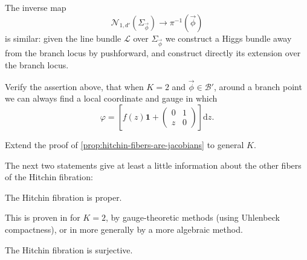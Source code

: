 \documentclass[12pt,letterpaper,reqno]{article}
\numberwithin{equation}{section}
\newcommand{\cB}{\ensuremath{\mathcal B}}
\newcommand{\cL}{\ensuremath{\mathcal L}}
\newcommand{\cN}{\ensuremath{\mathcal N}}
\newcommand\bid{{\mathbf 1}}
\newcommand{\de}{\mathrm{d}}
\newcommand{\fixme}[1]{{\color{orange}{[#1]}}}
\begin{document}
\begin{pf}
The inverse map 
\begin{equation}
\cN_{1,d'}(\Sigma_{\vec\phi}) \to \pi^{-1}(\vec\phi) 
\end{equation}
is similar: given the line bundle $\cL$
over $\Sigma_{\vec\phi}$ we construct a Higgs bundle
away from the branch locus by pushforward, and construct 
directly its extension over the branch locus.
\end{pf}

\begin{exercise} Verify the assertion above, that when $K=2$
and $\vec\phi \in \cB'$, around a branch point we can 
always find a local coordinate and gauge in which 
\begin{equation}
 \varphi = \left[f(z) \bid + \begin{pmatrix} 0 & 1 \\ z & 0 \end{pmatrix}\right] \de z.
\end{equation}
\end{exercise}

\begin{exercise} Extend the proof of \autoref{prop:hitchin-fibers-are-jacobians} to general $K$.
\end{exercise}

The next two statements give at least a little information about 
the other fibers of the Hitchin fibration:

\begin{prop} The Hitchin fibration
is proper.
\end{prop}

\begin{pf} 
This is proven in \cite{MR89a:32021} for $K=2$,
by gauge-theoretic methods (using Uhlenbeck compactness),
or in \cite{MR1085642} more generally by a more algebraic
method.
\end{pf}

\begin{prop} The Hitchin fibration
is surjective.
\end{prop}
\begin{pf}
\fixme{...}
\end{pf}
\end{document}
